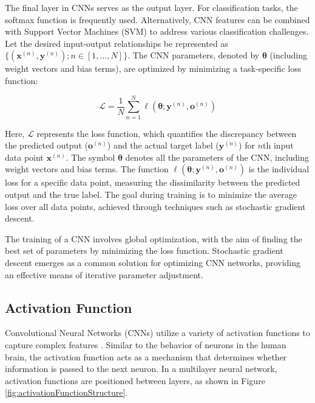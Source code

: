The final layer in CNNs serves as the output layer. For classification tasks, the softmax function is frequently used. Alternatively, CNN features can be combined with Support Vector Machines (SVM) to address various classification challenges. Let the desired input-output relationships be represented as $\{(\mathbf{x}^{(n)}, \mathbf{y}^{(n)}); n \in [1, \ldots, N]\}$. The CNN parameters, denoted by $\mathbf{\theta}$ (including weight vectors and bias terms), are optimized by minimizing a task-specific loss function:


\begin{equation}
	\mathcal{L} = \frac{1}{N} \sum_{n=1}^{N} \ell(\mathbf{\theta}; \mathbf{y}^{(n)}, \mathbf{o}^{(n)})
\end{equation}

Here, $\mathcal{L}$ represents the loss function, which quantifies the discrepancy between the predicted output ($\mathbf{o}^{(n)}$) and the actual target label ($\mathbf{y}^{(n)}$) for $n$th input data point $\mathbf{x}^{(n)}$. The symbol $\mathbf{\theta}$ denotes all the parameters of the CNN, including weight vectors and bias terms. The function $\ell(\mathbf{\theta}; \mathbf{y}^{(n)}, \mathbf{o}^{(n)})$ is the individual loss for a specific data point, measuring the dissimilarity between the predicted output and the true label. The goal during training is to minimize the average loss over all data points, achieved through techniques such as stochastic gradient descent.

The training of a CNN involves global optimization, with the aim of finding the best set of parameters by minimizing the loss function. Stochastic gradient descent emerges as a common solution for optimizing CNN networks, providing an effective means of iterative parameter adjustment.  

\subsection{Activation Function}
\label{subsection:ActivationFunction}

Convolutional Neural Networks (CNNs) utilize a variety of activation functions to capture complex features \cite{Li:2021}. Similar to the behavior of neurons in the human brain, the activation function acts as a mechanism that determines whether information is passed to the next neuron. In a multilayer neural network, activation functions are positioned between layers, as shown in Figure \ref{fig:activationFunctionStructure}.

